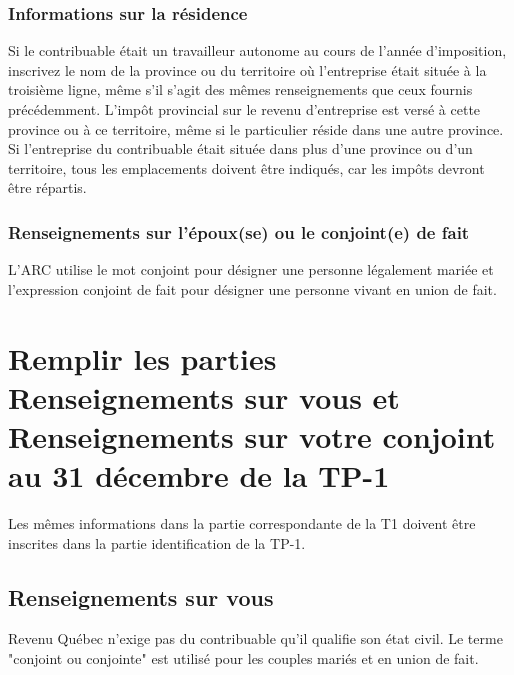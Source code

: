 \subsubsection{Informations sur la résidence}
Si le contribuable était un travailleur autonome au cours de l'année d'imposition, inscrivez le nom de la province ou du territoire où l'entreprise était située à la troisième ligne, même s'il s'agit des mêmes renseignements que ceux fournis précédemment. L'impôt provincial sur le revenu d'entreprise est versé à cette province ou à ce territoire, même si le particulier réside dans une autre province. Si l'entreprise du contribuable était située dans plus d'une province ou d'un territoire, tous les emplacements doivent être indiqués, car les impôts devront être répartis.

\subsubsection{Renseignements sur l'époux(se) ou le conjoint(e) de fait}
\ca
L'ARC utilise le mot \og conjoint\fg{} pour désigner une personne légalement mariée et l'expression \og conjoint de fait\fg{} pour désigner une personne vivant en union de fait. 



\section{Remplir les parties \og Renseignements sur vous\fg{} et  \og Renseignements sur votre conjoint au 31 décembre\fg{} de la TP-1}
\begin{intro}
	Les mêmes informations dans la partie correspondante de la T1 doivent être inscrites dans la partie identification de la TP-1.
\end{intro}


\subsection{Renseignements sur vous}
Revenu Québec n'exige pas du contribuable qu'il qualifie son état civil. Le terme "conjoint ou conjointe" est utilisé pour les couples mariés et en union de fait.



